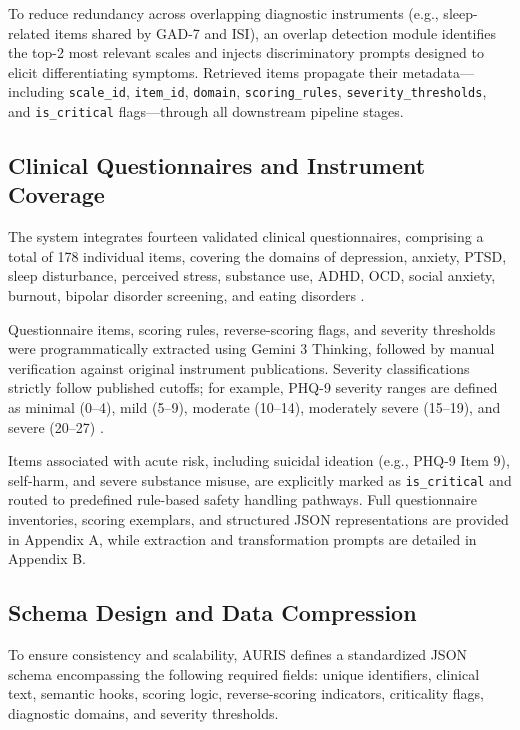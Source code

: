 \documentclass[sigconf]{acmart}
\begin{document}
To reduce redundancy across overlapping diagnostic instruments (e.g., sleep-related items shared by GAD-7 and ISI), an overlap detection module identifies the top-2 most relevant scales and injects discriminatory prompts designed to elicit differentiating symptoms. Retrieved items propagate their metadata---including \texttt{scale\_id}, \texttt{item\_id}, \texttt{domain}, \texttt{scoring\_rules}, \texttt{severity\_thresholds}, and \texttt{is\_critical} flags---through all downstream pipeline stages.

\subsection{Clinical Questionnaires and Instrument Coverage}
The system integrates fourteen validated clinical questionnaires, comprising a total of 178 individual items, covering the domains of depression, anxiety, PTSD, sleep disturbance, perceived stress, substance use, ADHD, OCD, social anxiety, burnout, bipolar disorder screening, and eating disorders \cite{24,25,26,27,28,29,30,31,32,33,34,35,36,37}.

Questionnaire items, scoring rules, reverse-scoring flags, and severity thresholds were programmatically extracted using Gemini 3 Thinking, followed by manual verification against original instrument publications. Severity classifications strictly follow published cutoffs; for example, PHQ-9 severity ranges are defined as minimal (0--4), mild (5--9), moderate (10--14), moderately severe (15--19), and severe (20--27) \cite{4}.

Items associated with acute risk, including suicidal ideation (e.g., PHQ-9 Item 9), self-harm, and severe substance misuse, are explicitly marked as \texttt{is\_critical} and routed to predefined rule-based safety handling pathways. Full questionnaire inventories, scoring exemplars, and structured JSON representations are provided in Appendix A, while extraction and transformation prompts are detailed in Appendix B.

\subsection{Schema Design and Data Compression}
To ensure consistency and scalability, AURIS defines a standardized JSON schema encompassing the following required fields: unique identifiers, clinical text, semantic hooks, scoring logic, reverse-scoring indicators, criticality flags, diagnostic domains, and severity thresholds.
\end{document}
